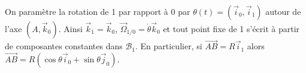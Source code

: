 \begin{corrigebox}
On paramètre la rotation de 1 par rapport à 0 par
$\theta(t)=(\vec i_0,\vec i_1)$ autour de l'axe $(A,\vec k_0)$.
Ainsi $\vec k_1=\vec k_0$, $\vec\Omega_{1/0}=\dot\theta\vec k_0$ et tout point
fixe de 1 s'écrit à partir de composantes constantes dans $\mathcal B_1$.
En particulier, si $\overrightarrow{AB}=R\vec i_1$ alors
$\overrightarrow{AB}=R(\cos\theta\vec i_0+\sin\theta\vec j_0)$.
\end{corrigebox}
